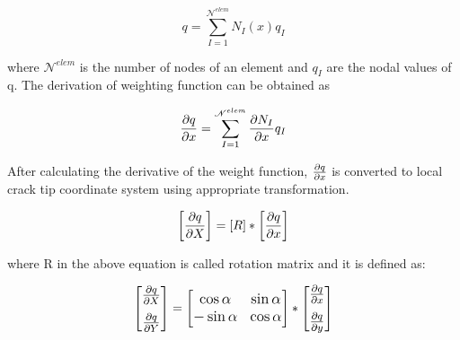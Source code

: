 \documentclass[fleqn, 12.5pt,a4paper]{report}
\begin{document}
$$q = \sum_{I=1}^{\mathscr{N}^{elem}} N_I(x)q_I $$

where ${\mathscr{N}^{elem}}$ is the number of nodes of an element and $q_I$ are the nodal values of q. The derivation of weighting function can be obtained as

$$\pdv{q}{x} = \sum_{I=1}^{\mathscr{N}^{elem}} \pdv{N_I}{x}q_I $$

After calculating the derivative of the weight function, $\pdv{q}{x}$ is converted to local crack tip coordinate system using appropriate transformation.

$$\left[\pdv{q}{X}\right] = [R] * \left[\pdv{q}{x}\right] $$

where R in the above equation is called rotation matrix and it is defined as:

$$
\large \begin{bmatrix} 
\pdv{q} {X} \\[7pt]
\pdv{q} {Y} \\
\end{bmatrix} \large
=
\begin{bmatrix}
\cos\alpha & \sin\alpha\\
-\sin\alpha & \cos\alpha\\
\end{bmatrix}
*
\large \begin{bmatrix} 
\pdv{q} {x} \\[7pt]
\pdv{q} {y} \\
\end{bmatrix} \large
$$


\newpage


\end{document}
